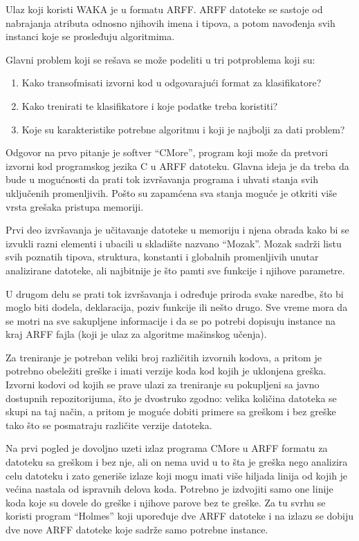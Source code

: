 \documentclass[a4paper]{article}
\theoremstyle{definition}
\begin{document}
{Ulaz koji koristi WAKA je u formatu ARFF.
ARFF datoteke se sastoje od nabrajanja atributa odnosno njihovih imena i tipova, a potom navođenja svih instanci koje se prosleđuju algoritmima.

Glavni problem koji se rešava se može podeliti u tri potproblema koji su:
\begin{enumerate}
\item Kako transofmisati izvorni kod u odgovarajući format za klasifikatore?
\item Kako trenirati te klasifikatore i koje podatke treba koristiti?
\item Koje su karakteristike potrebne algoritmu i koji je najbolji za dati problem?
\end{enumerate}



Odgovor na prvo pitanje je softver ``CMore'', program koji može da pretvori izvorni kod programskog
jezika C u ARFF datoteku. Glavna ideja je da treba da bude u mogućnosti da prati tok izvršavanja programa
i uhvati stanja svih uključenih promenljivih. Pošto su zapamćena sva stanja moguće je otkriti više vrsta
grešaka pristupa memoriji.

Prvi deo izvršavanja je učitavanje datoteke u memoriju i njena obrada kako bi se izvukli
razni elementi i ubacili u skladište nazvano ``Mozak''.
Mozak sadrži listu svih poznatih tipova, struktura, konstanti i globalnih promenljivih unutar analizirane datoteke,
ali najbitnije je što pamti sve funkcije i njihove parametre.

U drugom delu se prati tok izvršavanja i određuje
priroda svake naredbe, što bi moglo biti dodela, deklaracija, poziv funkcije ili nešto drugo.
Sve vreme mora da se motri na sve sakupljene informacije i da se po potrebi dopisuju instance na kraj ARFF fajla
(koji je ulaz za algoritme mašinskog učenja).


Za treniranje je potreban veliki broj različitih izvornih kodova, a pritom je potrebno obeležiti greške i imati verzije koda kod kojih je uklonjena greška.
Izvorni kodovi od kojih se prave ulazi za treniranje su pokupljeni sa javno dostupnih repozitorijuma, što je dvostruko zgodno:
velika količina datoteka se skupi na taj način, a pritom je moguće dobiti primere sa greškom i bez greške tako što se posmatraju različite verzije datoteka.

Na prvi pogled je dovoljno uzeti izlaz programa CMore u ARFF formatu za datoteku sa greškom i bez nje, ali on nema uvid u to šta je greška nego analizira celu datoteku i zato
generiše izlaze koji mogu imati više hiljada linija od kojih je većina nastala od ispravnih delova koda.
Potrebno je izdvojiti samo one linije koda koje su dovele do greške i njihove parove bez te greške.
Za tu svrhu se koristi program ``Holmes'' koji upoređuje dve ARFF datoteke i na izlazu se dobiju dve nove ARFF datoteke koje sadrže samo potrebne  instance.

}
\end{document}
